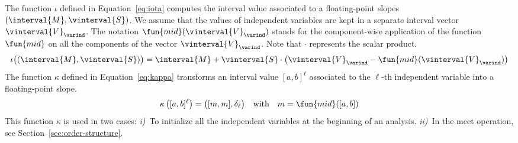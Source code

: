 The function $\iota$ defined in Equation~\eqref{eq:iota} computes the
interval value associated to a floating-point slopes $(\interval{M},
\vinterval{S})$. We assume that the values of independent variables
are kept in a separate interval vector $\vinterval{V}_\varind$. The
notation $\fun{mid}(\vinterval{V}_\varind)$ stands for the
component-wise application of the function $\fun{mid}$ on all the
components of the vector $\vinterval{V}_\varind$. Note that $\cdot$
represents the scalar product. {\small
\begin{equation}
  \label{eq:iota}
  \iota\big( (\interval{M}, \vinterval{S}) \big) = 
  \interval{M} + \vinterval{S} \cdot 
  \big(\vinterval{V}_\varind - \fun{mid}(\vinterval{V}_\varind)\big)
\end{equation}
}The function $\kappa$ defined in Equation~\eqref{eq:kappa} transforms
an interval value $[a,b]^\ell$ associated to the $\ell$-th independent
variable into a floating-point slope. {\small
  \begin{equation}
    \label{eq:kappa}
    \kappa\left( [a,b]^\ell\right) = \big( [m,m], \delta_\ell \big)
    \quad\text{with}\quad m=\fun{mid}([a,b])
  \end{equation}
}This function $\kappa$ is used in two cases: \textit{i)}~To
initialize all the independent variables at the beginning of an
analysis. \textit{ii)}~In the meet operation, see
Section~\ref{sec:order-structure}.

